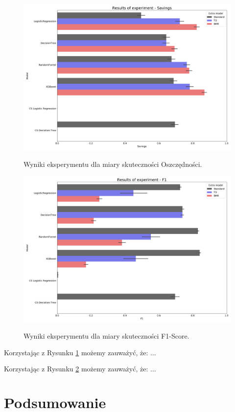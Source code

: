 \documentclass[openany]{book}
\begin{document}
	\begin{figure}[h]
		\includegraphics[width=\linewidth]{images/100_config1-Savings.png}
		\label{results-savings}
		\caption{Wyniki eksperymentu dla miary skuteczności Oszczędności.}	
	\end{figure}
	
	\begin{figure}[h]
		\includegraphics[width=\linewidth]{images/100_config1-F1.png}
		\label{results-f1}
		\caption{Wyniki eksperymentu dla miary skuteczności F1-Score.}
	\end{figure}
	
	Korzystając z Rysunku \ref{results-savings} możemy zauważyć, że: ...
	
	Korzystając z Rysunku \ref{results-f1} możemy zauważyć, że: ...	
	

\chapter{Podsumowanie}


\nocite{*}



\end{document}

